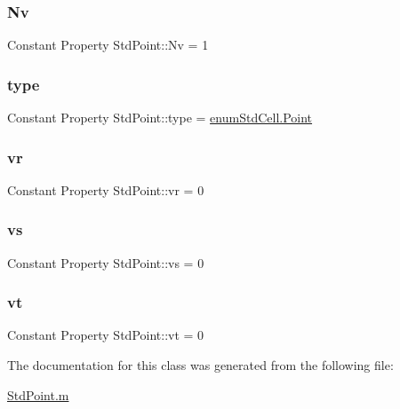 \subsubsection{\texorpdfstring{Nv}{Nv}}
{\footnotesize\ttfamily Constant Property Std\+Point\+::\+Nv = 1}

\mbox{\label{class_std_point_a72baba995f0fc1df0e09f0f1e4950caa}} 
\subsubsection{\texorpdfstring{type}{type}}
{\footnotesize\ttfamily Constant Property Std\+Point\+::type = \hyperlink{classenum_std_cell_ac4c2fa4e189e76e103f3ff9b1d19b9e7a055fa6159d5be915a3c9df01d16d5bb7}{enum\+Std\+Cell.\+Point}}

\mbox{\label{class_std_point_a82ae21042d299b3771099cd1e40d2359}} 
\subsubsection{\texorpdfstring{vr}{vr}}
{\footnotesize\ttfamily Constant Property Std\+Point\+::vr = 0}

\mbox{\label{class_std_point_a168706233ea575638c5a7027ef32d562}} 
\subsubsection{\texorpdfstring{vs}{vs}}
{\footnotesize\ttfamily Constant Property Std\+Point\+::vs = 0}

\mbox{\label{class_std_point_a1198b8d9346ab1e35a10e24ef803931a}} 
\subsubsection{\texorpdfstring{vt}{vt}}
{\footnotesize\ttfamily Constant Property Std\+Point\+::vt = 0}



The documentation for this class was generated from the following file\+:\begin{DoxyCompactItemize}
\item 
\hyperlink{_std_point_8m}{Std\+Point.\+m}\end{DoxyCompactItemize}
